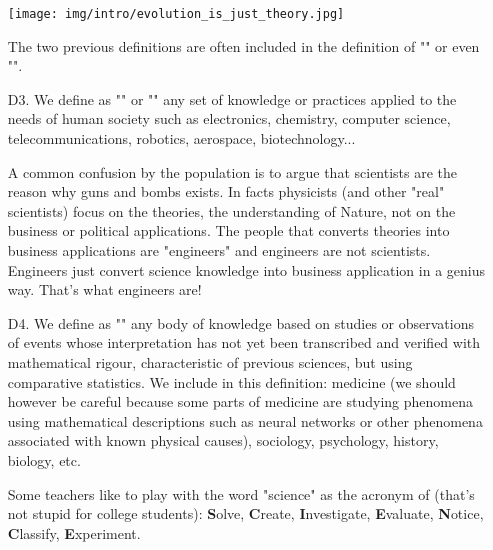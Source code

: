 \begin{itemize}
	
	\begin{center}
		\texttt{[image: img/intro/evolution\_is\_just\_theory.jpg]}
	\end{center}

	\begin{tcolorbox}[title=Remark,colframe=black,arc=10pt]
The two previous definitions are often included in the definition of "" or even "".
	\end{tcolorbox}
	
	\item[D3.] We define as "" or "" any set of knowledge or practices applied to the needs of human society such as electronics, chemistry, computer science, telecommunications, robotics, aerospace, biotechnology... 
	
	\begin{tcolorbox}[title=Remark,colframe=black,arc=10pt]
	A common confusion by the population is to argue that scientists are the reason why guns and bombs exists. In facts physicists (and other "real" scientists) focus on the theories, the understanding of Nature, not on the business or political applications. The people that converts theories into business applications are "engineers" and engineers are not scientists. Engineers just convert science knowledge into business application in a genius way. That's what engineers are!
	\end{tcolorbox}

	\item[D4.] We define as "" any body of knowledge based on studies or observations of events whose interpretation has not yet been transcribed and verified with mathematical rigour, characteristic of previous sciences, but using comparative statistics. We include in this definition: medicine (we should however be careful because some parts of medicine are studying phenomena using mathematical descriptions such as neural networks or other phenomena associated with known physical causes), sociology, psychology, history, biology, etc.
	
	Some teachers like to play with the word "science" as the acronym of (that's not stupid for college students): \textbf{S}olve, \textbf{C}reate, \textbf{I}nvestigate, \textbf{E}valuate, \textbf{N}otice, \textbf{C}lassify, \textbf{E}xperiment.
	

\end{itemize}
